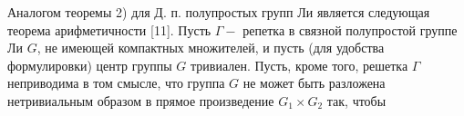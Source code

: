 \documentclass[10pt]{article}
\begin{document}
Аналогом теоремы 2) для Д. п. полупростых групп Ли является следующая теорема арифметичности [11]. Пусть $\Gamma-$ репетка в связной полупростой группе Ли $G$, не имеющей компактных множителей, и пусть (для удобства формулировки) центр группы $G$ тривиален. Пусть, кроме того, решетка $\Gamma$ неприводима в том смысле, что группа $G$ не может быть разложена нетривиальным образом в прямое произведение $G_{1} \times G_{2}$ так, чтобы
\end{document}
